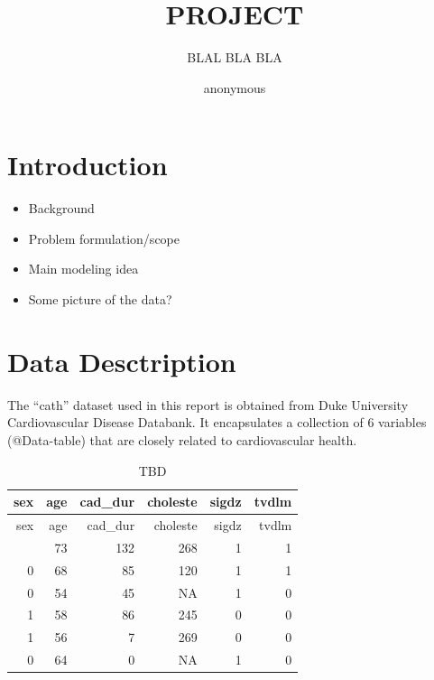 \documentclass[
  letterpaper,
  DIV=11,
  numbers=noendperiod]{scrartcl}
\title{PROJECT}
\subtitle{BLAL BLA BLA}
\author{anonymous}
\date{}
\providecommand{\tightlist}{%
  \setlength{\itemsep}{0pt}\setlength{\parskip}{0pt}}\usepackage{longtable,booktabs,array}
\begin{document}
\maketitle
\ifdefined\Shaded\renewenvironment{Shaded}{\begin{tcolorbox}[sharp corners, frame hidden, borderline west={3pt}{0pt}{shadecolor}, breakable, interior hidden, enhanced, boxrule=0pt]}{\end{tcolorbox}}\fi

\hypertarget{introduction}{%
\section{Introduction}\label{introduction}}

\begin{itemize}
\tightlist
\item
  Background
\item
  Problem formulation/scope
\item
  Main modeling idea
\item
  Some picture of the data?
\end{itemize}

\hypertarget{data-desctription}{%
\section{Data Desctription}\label{data-desctription}}

The ``cath'' dataset used in this report is obtained from Duke
University Cardiovascular Disease Databank. It encapsulates a collection
of 6 variables (@Data-table) that are closely related to cardiovascular
health.

\begin{longtable}[]{@{}rrrrrr@{}}
\caption{TBD }\tabularnewline
\toprule\noalign{}
sex & age & cad\_dur & choleste & sigdz & tvdlm \\
\midrule\noalign{}
\endfirsthead
\toprule\noalign{}
sex & age & cad\_dur & choleste & sigdz & tvdlm \\
\midrule\noalign{}
\endhead
\bottomrule\noalign{}
\endlastfoot
0 & 73 & 132 & 268 & 1 & 1 \\
0 & 68 & 85 & 120 & 1 & 1 \\
0 & 54 & 45 & NA & 1 & 0 \\
1 & 58 & 86 & 245 & 0 & 0 \\
1 & 56 & 7 & 269 & 0 & 0 \\
0 & 64 & 0 & NA & 1 & 0 \\
\end{longtable}
\end{document}
